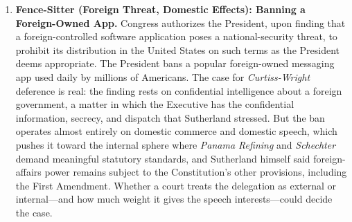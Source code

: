 \documentclass[12pt]{article}
\begin{document}
\begin{enumerate}
\item \textbf{Fence-Sitter (Foreign Threat, Domestic Effects): Banning a Foreign-Owned App.} Congress authorizes the President, upon finding that a foreign-controlled software application poses a national-security threat, to prohibit its distribution in the United States on such terms as the President deems appropriate. The President bans a popular foreign-owned messaging app used daily by millions of Americans. The case for \textit{Curtiss-Wright} deference is real: the finding rests on confidential intelligence about a foreign government, a matter in which the Executive has the confidential information, secrecy, and dispatch that Sutherland stressed. But the ban operates almost entirely on domestic commerce and domestic speech, which pushes it toward the internal sphere where \textit{Panama Refining} and \textit{Schechter} demand meaningful statutory standards, and Sutherland himself said foreign-affairs power remains subject to the Constitution's other provisions, including the First Amendment. Whether a court treats the delegation as external or internal---and how much weight it gives the speech interests---could decide the case.

\end{enumerate}
\end{document}
